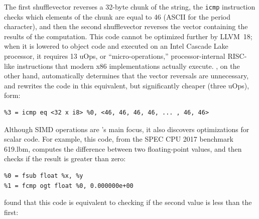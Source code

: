
The first shufflevector reverses a 32-byte chunk of the string, the
\texttt{icmp} instruction checks which elements of the chunk are equal
to 46 (ASCII for the period character), and then the second
shufflevector reverses the vector containing the results of the
computation.
%
This code cannot be optimized further by LLVM~18; when it is lowered to
object code and executed on an Intel Cascade Lake processor, it
requires 13 uOps, or ``micro-operations,'' processor-internal
RISC-like instructions that modern x86 implementations actually
execute.
%
\minotaur{}, on the other hand, automatically determines that the vector
reversals are unnecessary, and rewrites the code in this equivalent,
but significantly cheaper (three uOps), form:

{\begin{quoting}
\begin{Verbatim}
%3 = icmp eq <32 x i8> %0, <46, 46, 46, 46, ... , 46, 46>
\end{Verbatim}
\end{quoting}}



Although SIMD operations are \minotaur's main focus, it also discovers
optimizations for scalar code.
%
For example, this code, from the SPEC CPU 2017 benchmark 619.lbm,
computes the difference between two floating-point values, and then
checks if the result is greater than zero:

{\begin{quoting}\begin{Verbatim}
%0 = fsub float %x, %y
%1 = fcmp ogt float %0, 0.000000e+00
\end{Verbatim}
\end{quoting}}

\minotaur{} found that this code is equivalent to checking if the second
value is less than the first:

